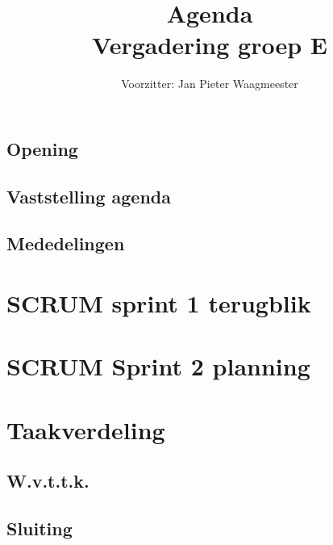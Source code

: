 \documentclass[a4paper]{article}
\title{Agenda \\ Vergadering groep E}
\author{Voorzitter: Jan Pieter Waagmeester}
\begin{document}
\maketitle
\subsection*{Opening}
\subsection*{Vaststelling agenda}
\subsection*{Mededelingen}
\section{SCRUM sprint 1 terugblik}
\section{SCRUM Sprint 2 planning}
\section{Taakverdeling}
\subsection*{W.v.t.t.k.}
\subsection*{Sluiting}
\end{document}
